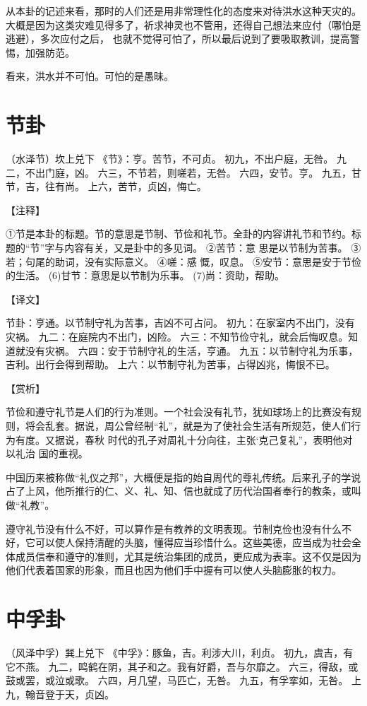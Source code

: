 \documentclass[12pt,UTF8]{ctexbook}
\begin{document}
从本卦的记述来看，那时的人们还是用非常理性化的态度来对待洪水这种天灾的。大概是因为这类灾难见得多了，祈求神灵也不管用，还得自己想法来应付（哪怕是逃避），多次应付之后， 也就不觉得可怕了，所以最后说到了要吸取教训，提高警惕，加强防范。

看来，洪水并不可怕。可怕的是愚昧。

\chapter{节卦}

（水泽节）坎上兑下
《节》：亨。苦节，不可贞。
初九，不出户庭，无咎。
九二，不出门庭，凶。
六三，不节若，则嗟若，无咎。
六四，安节。亨。
九五，甘节，吉，往有尚。
上六，苦节，贞凶，悔亡。

【注释】

①节是本卦的标题。节的意思是节制、节俭和礼节。全卦的内容讲礼节和节约。标题的“节”字与内容有关，又是卦中的多见词。
②苦节：意 思是以节制为苦事。
③若；句尾的助词，没有实际意义。
④嗟：感 慨，叹息。
⑤安节：意思是安于节俭的生活。
(6)甘节：意思是以节制为乐事。
(7)尚：资助，帮助。

【译文】

节卦：亨通。以节制守礼为苦事，吉凶不可占问。
初九：在家室内不出门，没有灾祸。
九二：在庭院内不出门，凶险。
六三：不知节俭守礼，就会后悔叹息。知道就没有灾祸。
六四：安于节制守礼的生活，亨通。
九五：以节制守礼为乐事，吉利。出行会得到帮助。
上六：以节制守礼为苦事，占得凶兆，悔恨不已。

【赏析】

节俭和遵守礼节是人们的行为准则。一个社会没有礼节，犹如球场上的比赛没有规则，将会乱套。据说，周公曾经制“礼”，就是为了使社会生活有所规范，使人们行为有度。又据说，春秋 时代的孔子对周礼十分向往，主张‘克己复礼”，表明他对以礼治 国的重视。

中国历来被称做“礼仪之邦”，大概便是指的始自周代的尊礼传统。后来孔子的学说占了上风，他所推行的仁、义、礼、知、信也就成了历代治国者奉行的教条，或叫做“礼教”。

遵守礼节没有什么不好，可以算作是有教养的文明表现。节制克俭也没有什么不好，它可以使人保持清醒的头脑，懂得应当珍惜什么。这些美德，应当成为社会全体成员信奉和遵守的准则，尤其是统治集团的成员，更应成为表率。这不仅是因为他们代表着国家的形象，而且也因为他们手中握有可以使人头脑膨胀的权力。

\chapter{中孚卦}

（风泽中孚）巽上兑下
《中孚》：豚鱼，吉。利涉大川，利贞。
初九，虞吉，有它不燕。
九二，鸣鹤在阴，其子和之。我有好爵，吾与尔靡之。
六三，得敌，或鼓或罢，或泣或歌。
六四，月几望，马匹亡，无咎。
九五，有孚挛如，无咎。
上九，翰音登于天，贞凶。
\end{document}
